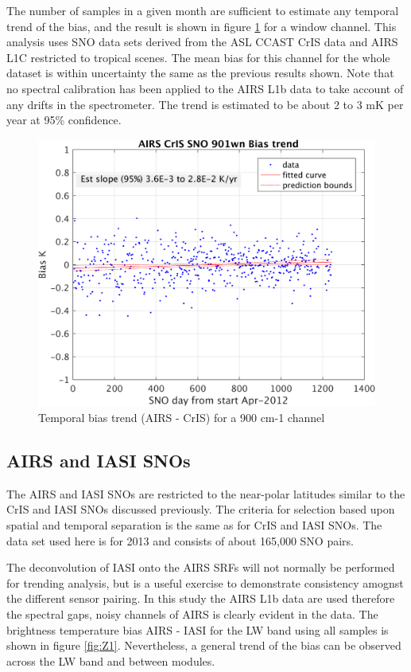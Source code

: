 \documentclass[11pt]{article}
\begin{document}
The number of samples in a given month are sufficient to estimate any temporal trend of the bias, and the result is shown in figure \ref{fig:Y7} for a window channel. This analysis uses SNO data sets derived
from the ASL CCAST CrIS data and AIRS L1C restricted to tropical scenes. The mean
bias for this channel for the whole dataset is within uncertainty the same as the previous results shown. Note that no spectral calibration has been applied to the AIRS L1b data to take account of any drifts in the spectrometer. The trend is estimated to be about 2 to 3 mK per year at 95\% confidence. 

\begin{figure}[htb]
\centering
\includegraphics[width=.6\linewidth]{./figs/AC_aslSNO_2012-15_trop_biasTrend_901wn_screened.png}
\caption{\label{fig:orgparagraph18}
  Temporal bias trend (AIRS - CrIS) for a 900 cm-1 channel}
\label{fig:Y7}
\end{figure}


\subsection{AIRS and IASI SNOs}
\label{sec:orgheadline10}
The AIRS and IASI SNOs are restricted to the near-polar latitudes similar to the 
CrIS and IASI SNOs discussed previously. The criteria for selection based upon spatial and temporal separation is the same as for CrIS and IASI SNOs. The data set used here is for 2013 and consists of about 165,000 SNO pairs. 

The deconvolution of IASI onto the AIRS SRFs will not normally be performed for trending analysis, but is a useful exercise to demonstrate consistency amognst the different sensor pairing. In this study the AIRS L1b data are used therefore the spectral gaps, noisy channels of AIRS is clearly evident in the data. The
brightness temperature bias AIRS - IASI for the LW band using all samples is shown in figure \ref{fig:Z1}. Nevertheless, a general trend of the bias can be observed across the LW band and between modules.
\end{document}
